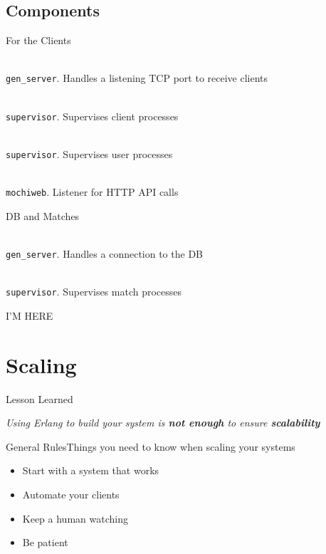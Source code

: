 \documentclass[utf8]{beamer}
\begin{document}
\subsection{Components}
\begin{frame}{For the Clients}
	\begin{description}
		\item<+->[client\_listener]\ \\
			\texttt{gen\_server}. Handles a listening TCP port to receive clients
		\item<+->[client\_sup]\ \\
			\texttt{supervisor}. Supervises client processes
		\item<+->[user\_sup]\ \\
			\texttt{supervisor}. Supervises user processes
		\item<+->[web]\ \\
			\texttt{mochiweb}. Listener for HTTP API calls
	\end{description}
\end{frame}
\begin{frame}{DB and Matches}
	\begin{description}
		\item<+->[db]\ \\
			\texttt{gen\_server}. Handles a connection to the DB
		\item<+->[match\_sup]\ \\
			\texttt{supervisor}. Supervises match processes
	\end{description}
\end{frame}

I'M HERE

\section{Scaling}
\begin{frame}{Lesson Learned}
	\begin{center}
		\Large \emph{Using Erlang to build your system is \textbf{not enough} to ensure \textbf{scalability}}
	\end{center}
\end{frame}

\begin{frame}{General Rules}{Things you need to know when scaling your systems}
	\begin{itemize}
		\item<1> Start with a system that \alert{works}
		\item<2> Automate your clients
		\item<3> Keep a human watching
		\item<4> Be patient
	\end{itemize}
\end{frame}
\end{document}
